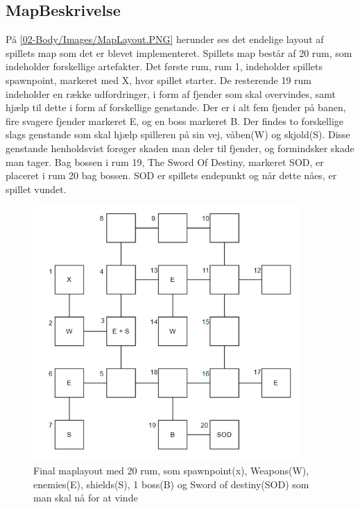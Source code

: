 \subsection{MapBeskrivelse}

På \autoref{02-Body/Images/MapLayout.PNG} herunder ses det endelige layout af spillets map som det er blevet implementeret. 
Spillets map består af 20 rum, som indeholder forskellige artefakter.  
Det første rum, rum 1, indeholder spillets spawnpoint, markeret med X, hvor spillet starter.  
De resterende 19 rum indeholder en række udfordringer, i form af fjender som skal overvindes, samt hjælp til dette i form af forskellige genstande. 
Der er i alt fem fjender på banen, fire svagere fjender markeret E, og en boss markeret B. 
Der findes to forskellige slags genstande som skal hjælp spilleren på sin vej, våben(W) og skjold(S).  
Disse genstande henholdsvist forøger skaden man deler til fjender, og formindsker skade man tager. 
Bag bossen i rum 19, 
The Sword Of Destiny, markeret SOD, er placeret i rum 20 bag bossen. SOD er spillets endepunkt og når dette nåes, er spillet vundet.



\begin{figure}[H]
\centering
\includegraphics[width = 0.9\textwidth]{02-Body/Images/MapLayout.PNG}
\caption{Final maplayout med 20 rum, som spawnpoint(x), Weapons(W), enemies(E), shields(S), 1 boss(B) og Sword of destiny(SOD) som man skal nå for at vinde}
\label{fig:MapLayout-final}
\end{figure}